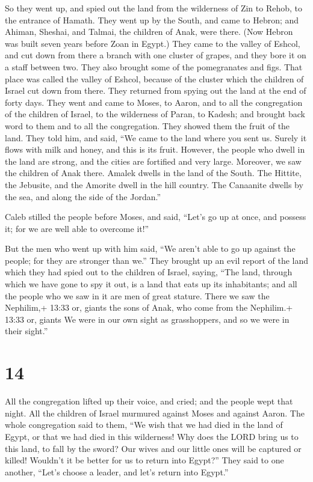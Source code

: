  So they went up, and spied out the land from the
wilderness of Zin to Rehob, to the entrance of Hamath. 
They went up by the South, and came to Hebron; and Ahiman, Sheshai, and
Talmai, the children of Anak, were there. (Now Hebron was built seven
years before Zoan in Egypt.)  They came to the valley of
Eshcol, and cut down from there a branch with one cluster of grapes, and
they bore it on a staff between two. They also brought some of the
pomegranates and figs.  That place was called the valley of
Eshcol, because of the cluster which the children of Israel cut down
from there.  They returned from spying out the land at the
end of forty days.  They went and came to Moses, to Aaron,
and to all the congregation of the children of Israel, to the wilderness
of Paran, to Kadesh; and brought back word to them and to all the
congregation. They showed them the fruit of the land.  They
told him, and said, ``We came to the land where you sent us. Surely it
flows with milk and honey, and this is its fruit.  However,
the people who dwell in the land are strong, and the cities are
fortified and very large. Moreover, we saw the children of Anak there.
 Amalek dwells in the land of the South. The Hittite, the
Jebusite, and the Amorite dwell in the hill country. The Canaanite
dwells by the sea, and along the side of the Jordan.''

 Caleb stilled the people before Moses, and said, ``Let's
go up at once, and possess it; for we are well able to overcome it!''

 But the men who went up with him said, ``We aren't able to
go up against the people; for they are stronger than we.'' 
They brought up an evil report of the land which they had spied out to
the children of Israel, saying, ``The land, through which we have gone
to spy it out, is a land that eats up its inhabitants; and all the
people who we saw in it are men of great stature.  There we
saw the Nephilim,+ 13:33 or, giants the sons of Anak, who come from the
Nephilim.+ 13:33 or, giants We were in our own sight as grasshoppers,
and so we were in their sight.''

\hypertarget{section-13}{%
\section{14}\label{section-13}}

 All the congregation lifted up their voice, and cried; and
the people wept that night.  All the children of Israel
murmured against Moses and against Aaron. The whole congregation said to
them, ``We wish that we had died in the land of Egypt, or that we had
died in this wilderness!  Why does the LORD bring us to this
land, to fall by the sword? Our wives and our little ones will be
captured or killed! Wouldn't it be better for us to return into Egypt?''
 They said to one another, ``Let's choose a leader, and
let's return into Egypt.''

